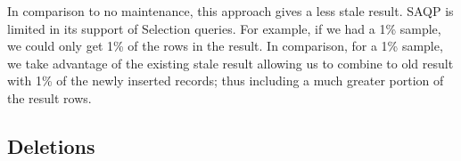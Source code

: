 In comparison to no maintenance, this approach gives a less stale result.
SAQP is limited in its support of Selection queries.
For example, if we had a 1\% sample, we could only get 1\% of the rows in the result.
In comparison, for a 1\% sample, we take advantage of the existing stale result allowing us to combine to old result with 1\% of the newly inserted records; thus including a much greater portion of the result rows.

\subsection{Deletions}\label{sec:del}
